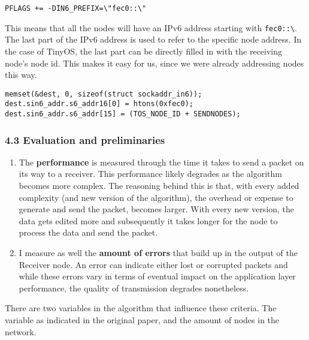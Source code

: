 \begin{verbatim}
PFLAGS += -DIN6_PREFIX=\"fec0::\"
\end{verbatim}

This means that all the nodes will have an IPv6 address starting with
\texttt{fec0::\textbackslash{}}. The last part of the IPv6 address is
used to refer to the specific node address. In the case of TinyOS, the
last part can be directly filled in with the receiving node's node id.
This makes it easy for us, since we were already addressing nodes this
way.

\begin{verbatim}
memset(&dest, 0, sizeof(struct sockaddr_in6));
dest.sin6_addr.s6_addr16[0] = htons(0xfec0);
dest.sin6_addr.s6_addr[15] = (TOS_NODE_ID + SENDNODES);
\end{verbatim}

\subsubsection{4.3 Evaluation and
preliminaries}\label{evaluation-and-preliminaries}

\begin{enumerate}
\def\labelenumi{\arabic{enumi}.}
\itemsep1pt\parskip0pt
\item
  The \textbf{performance} is measured through the time it takes to send
  a packet on its way to a receiver. This performance likely degrades as
  the algorithm becomes more complex. The reasoning behind this is that,
  with every added complexity (and new version of the algorithm), the
  overhead or expense to generate and send the packet, becomes larger.
  With every new version, the data gets edited more and subsequently it
  takes longer for the node to process the data and send the packet.
\item
  I measure as well the \textbf{amount of errors} that build up in the
  output of the Receiver node. An error can indicate either lost or
  corrupted packets and while these errors vary in terms of eventual
  impact on the application layer performance, the quality of
  transmission degrades nonetheless.
\end{enumerate}

There are two variables in the algorithm that influence these criteria.
The variable \emph{} as indicated in the original paper, and the amount
of nodes in the network.


